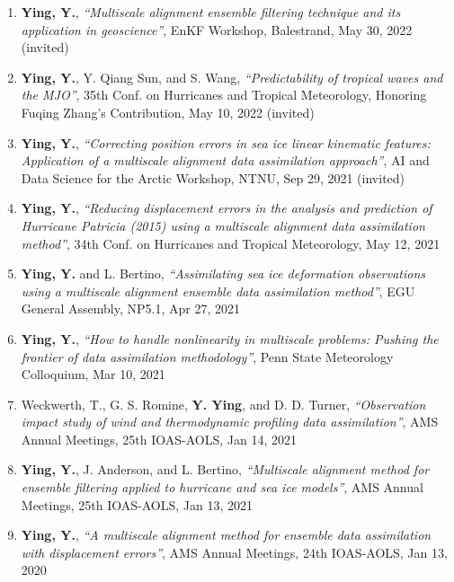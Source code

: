 \begin{enumerate}
\item \textbf{Ying, Y.},
\textit{``Multiscale alignment ensemble filtering technique and its application in geoscience''},
EnKF Workshop, Balestrand, May 30, 2022
(invited)

\item \textbf{Ying, Y.}, Y. Qiang Sun, and S. Wang,
\textit{``Predictability of tropical waves and the MJO''},
35th Conf. on Hurricanes and Tropical Meteorology, Honoring Fuqing Zhang’s Contribution, May 10, 2022
(invited)

\item \textbf{Ying, Y.},
\textit{``Correcting position errors in sea ice linear kinematic features: Application of a multiscale alignment data assimilation approach''},
AI and Data Science for the Arctic Workshop, NTNU, Sep 29, 2021
(invited)

\item \textbf{Ying, Y.},
\textit{``Reducing displacement errors in the analysis and prediction of Hurricane Patricia (2015) using a multiscale alignment data assimilation method''},
34th Conf. on Hurricanes and Tropical Meteorology, May 12, 2021

\item \textbf{Ying, Y.} and L. Bertino,
\textit{``Assimilating sea ice deformation observations using a multiscale alignment ensemble data assimilation method''},
EGU General Assembly, NP5.1, Apr 27, 2021

\item \textbf{Ying, Y.},
\textit{``How to handle nonlinearity in multiscale problems: Pushing the frontier of data assimilation methodology''},
Penn State Meteorology Colloquium, Mar 10, 2021

\item Weckwerth, T., G. S. Romine, \textbf{Y. Ying}, and D. D. Turner,
\textit{``Observation impact study of wind and thermodynamic profiling data assimilation''},
AMS Annual Meetings, 25th IOAS-AOLS, Jan 14, 2021

\item \textbf{Ying, Y.}, J. Anderson, and L. Bertino,
\textit{``Multiscale alignment method for ensemble filtering applied to hurricane and sea ice models''},
AMS Annual Meetings, 25th IOAS-AOLS, Jan 13, 2021

\item \textbf{Ying, Y.},
\textit{``A multiscale alignment method for ensemble data assimilation with displacement errors''},
AMS Annual Meetings, 24th IOAS-AOLS, Jan 13, 2020


\end{enumerate}
